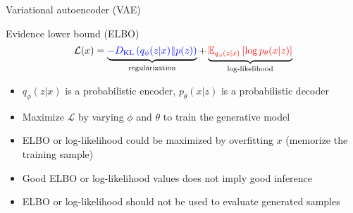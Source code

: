 \documentclass [aspectratio=169]{beamer}
\begin{document}
\begin{frame}{Variational autoencoder (VAE)}
    \begin{block}{Evidence lower bound (ELBO)}
        \begin{equation*}
            \mathcal{L}(x)=\underbrace{\color{blue}-D_{\mathrm{KL}}\left(q_{\phi}(z | x) \| p(z)\right) }_{\text{regularization}}+ \underbrace{\color{red}\mathbb{E}_{q_{\phi}(z | x)}\left[\log p_{\theta}(x | z)\right]}_{\text{log-likelihood}}
        \end{equation*}
	\end{block}
	\begin{itemize}
        \item $q_{\phi}(z | x)$ is a probabilistic encoder, $p_{\theta}(x | z)$ is a probabilistic decoder
        \item Maximize $\mathcal{L}$ by varying $\phi$ and $\theta$ to train the generative model
        \item ELBO or log-likelihood could be maximized by overfitting $x$ (memorize the training sample)
        \item Good ELBO or log-likelihood values does not imply good inference
        \item ELBO or log-likelihood should not be used to evaluate generated samples
    \end{itemize}
\end{frame}
\end{document}

